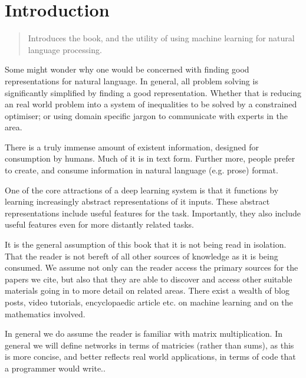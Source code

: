 \documentclass[12pt,parskip]{komatufte}
\begin{document}

\chapter{Introduction}\label{sec:introduction}
\begin{abstract}
	Introduces the book, and the utility of using machine learning for natural language processing.
\end{abstract}

Some might wonder why one would be concerned with finding good representations for natural language.
In general, all problem solving is significantly simplified by finding a good representation.
Whether that is reducing an real world problem into a system of inequalities to be solved by a constrained optimiser; or using domain specific jargon to communicate with experts in the area.


There is a truly immense amount of existent information, designed for consumption by humans.
Much of it is in text form.
Further more, people prefer to create, and consume information in natural language (e.g. prose) format.



One of the core attractions of a deep learning system is that it functions by learning increasingly abstract representations of it inputs.
These abstract representations include useful features for the task.
Importantly, they also include useful features even for more distantly related tasks.




It is the general assumption of this book that it is not being read in isolation.
That the reader is not bereft of all other sources of knowledge as it is being consumed.
We assume not only can the reader access the primary sources for the papers we cite,
but also that they are able to discover and access other suitable materials going in to more detail on related areas.
There exist a wealth of blog posts, video tutorials, encyclopaedic article etc. on machine learning and on the mathematics involved.

In general we do assume the reader is familiar with matrix multiplication.
In general we will define networks in terms of matricies (rather than sums),
as this is more concise, and better reflects real world applications,
in terms of code that a programmer would write..
\end{document}
